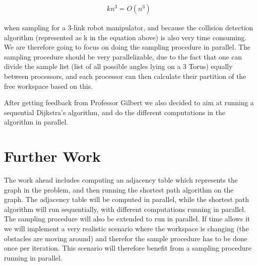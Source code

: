 \begin{align}
\label{eq:}
kn^3=O(n^3) 
 \end{align}

when sampling for a 3-link robot manipulator, and because the collision detection algorithm (represented as k in the equation above) is also very time consuming. We are therefore going to focus on doing the sampling procedure in parallel. The sampling procedure should be very parallelizable, due to the fact that one can divide the sample list (list of all possible angles lying on a 3 Torus) equally between processors, and each processor can then calculate their partition of the free workspace based on this. 

After getting feedback from Professor Gilbert we also decided to  aim at running a sequential Dijkstra's algorithm, and do the different computations in the algorithm in parallel. 

\section*{Further Work}

The work ahead includes computing an adjacency table which represents the graph in the problem, and then running the shortest path algorithm on the graph. The adjacency table will be computed in parallel, while the shortest path algorithm will run sequentially, with different computations running in parallel. The sampling procedure will also be extended to run in parallel. If time allows it we will implement a very realistic scenario where the workspace is changing (the obstacles are moving around) and therefor the sample procedure has to be done once per iteration. This scenario will therefore benefit from a sampling procedure running in parallel.








